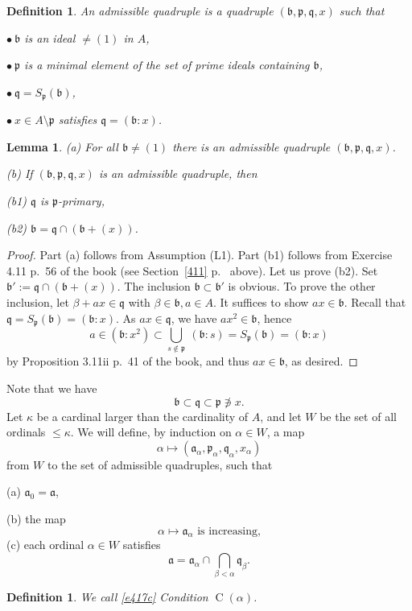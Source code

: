 \documentclass[parskip=half,fontsize=12pt]{scrartcl}%
\newcommand{\oo}{\operatorname}\newcommand{\ooo}{\operatorname*}
\newcommand{\mf}{\mathfrak}
\newcommand{\aaa}{\mf a}
\newcommand{\bbb}{\mf b}
\newcommand{\ppp}{\mf p}
\newcommand{\qqq}{\mf q}
\newcommand{\bu}{\bullet}
\newtheorem{df}[thm]{Definition}
\newtheorem{lem}[thm]{Lemma}
\begin{document}
\begin{df} 
An \emph{admissible quadruple} is a quadruple $(\bbb,\ppp,\qqq,x)$ such that 

$\bu\ \bbb$ is an ideal $\ne(1)$ in $A$, 

$\bu\ \mathfrak p$ is a minimal element of the set of prime ideals containing $\bbb$, 

$\bu\ \mathfrak q=S_{\mathfrak p}(\bbb)$, 

$\bu\ x\in A\setminus\ppp$ satisfies $\mathfrak q=(\bbb:x)$. 
\end{df}

\begin{lem}\label{l417}
 \emph{(a)} For all $\bbb\ne(1)$ there is an admissible quadruple $(\bbb,\ppp,\qqq,x)$.

\emph{(b)} If $(\bbb,\ppp,\qqq,x)$ is an admissible quadruple, then 

\emph{(b1)} $\mathfrak q$ is $\mathfrak p$-primary, 

\emph{(b2)} $\bbb=\mathfrak q\cap(\bbb+(x))$.
\end{lem}

\begin{proof}
Part (a) follows from Assumption (L1). Part (b1) follows from Exercise 4.11 p.~56 of the book (see Section~\ref{411} p.~\pageref{411} above). Let us prove (b2). Set $\bbb':=\mathfrak q\cap(\bbb+(x))$. The inclusion $\bbb\subset\bbb'$ is obvious. To prove the other inclusion, let $\beta+ax\in\qqq$ with $\beta\in\bbb,a\in A$. It suffices to show $ax\in\bbb$. Recall that $\qqq=S_{\ppp}(\bbb)=(\bbb:x)$. As $ax\in\qqq$, we have $ax^2\in\bbb$, hence 
$$
a\in(\bbb:x^2)\subset\bigcup_{s\notin\ppp}\ (\bbb:s)=S_{\ppp}(\bbb)=(\bbb:x)
$$ 
by Proposition 3.11ii p.~41 of the book, and thus $ax\in\bbb$, as desired. 
\end{proof}

Note that we have 
$$
\bbb\subset\qqq\subset\ppp\not\ni x.
$$
Let $\kappa$ be a cardinal larger than the cardinality of $A$, and let $W$ be the set of all ordinals $\le\kappa$. We will define, by induction on $\alpha\in W$, a map 
\begin{equation}\label{e417a}
\alpha\mapsto(\aaa_\alpha,\ppp_\alpha,\qqq_\alpha,x_\alpha)
\end{equation}
from $W$ to the set of admissible quadruples, such that 

(a) $\aaa_0=\aaa$, 

(b) the map 
\begin{equation}\label{e417b}
\alpha\mapsto\aaa_\alpha\text{ is increasing,}
\end{equation} 
(c) each ordinal $\alpha\in W$ satisfies 
\begin{equation}\label{e417c}
\aaa=\aaa_\alpha\cap\bigcap_{\beta<\alpha}\qqq_\beta.
\end{equation}
\begin{df}\label{calpha}
We call \eqref{e417c} Condition $\oo C(\alpha)$. 
\end{df}
\end{document}
